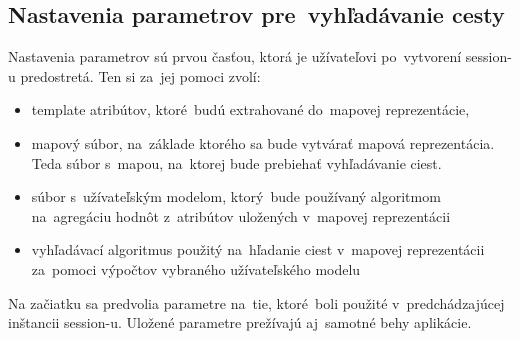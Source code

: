 \subsection{Nastavenia parametrov pre~vyhľadávanie cesty}

Nastavenia parametrov sú prvou časťou, ktorá je užívateľovi po~vytvorení session-u predostretá. Ten si za~jej pomoci zvolí:

\begin{itemize}
    \item template atribútov, ktoré~budú extrahované do~mapovej reprezentácie, 
    \item mapový súbor, na~základe ktorého sa bude vytvárať mapová reprezentácia. Teda súbor s~mapou, na~ktorej bude prebiehať vyhľadávanie ciest.
    \item súbor s~užívateľským modelom, ktorý~bude používaný algoritmom na~agregáciu hodnôt z~atribútov uložených v~mapovej reprezentácii  
    \item vyhľadávací algoritmus použitý na~hľadanie ciest v~mapovej reprezentácii za~pomoci výpočtov vybraného užívateľského modelu
\end{itemize}

Na začiatku sa predvolia parametre na~tie, ktoré~boli použité v~predchádzajúcej inštancii session-u. Uložené parametre prežívajú aj~samotné behy aplikácie.  

